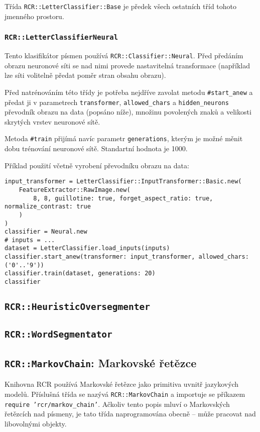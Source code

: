 \documentclass[a4paper]{article}
\begin{document}
Třída \texttt{RCR::LetterClassifier::Base} je předek všech ostatních tříd
tohoto jmenného prostoru.

\subsubsection{\texttt{RCR::LetterClassifierNeural}}
Tento klasifikátor písmen používá \texttt{RCR::Classifier::Neural}.
Před předáním obrazu neuronové síti se nad nimi provede nastavitelná
transformace (například lze síti volitelně předat poměr stran obsahu
obrazu).

Před natrénováním této třídy je potřeba nejdříve zavolat metodu
\texttt{\#start\_anew} a předat ji v parametrech \texttt{transformer},
\texttt{allowed\_chars} a \texttt{hidden\_neurons} převodník obrazu
na data (popsáno níže), množinu povolených znaků a velikosti skrytých
vrstev neuronové sítě.

Metoda \texttt{\#train} přijímá navíc parametr \texttt{generations},
kterým je možné měnit dobu trénování neuronové sítě. Standartní hodnota
je 1000.

Příklad použití včetně vyrobení převodníku obrazu na data:
\begin{lstlisting}
input_transformer = LetterClassifier::InputTransformer::Basic.new(
	FeatureExtractor::RawImage.new(
		8, 8, guillotine: true, forget_aspect_ratio: true, normalize_contrast: true
	)
)
classifier = Neural.new
# inputs = ...
dataset = LetterClassifier.load_inputs(inputs)
classifier.start_anew(transformer: input_transformer, allowed_chars: ('0'..'9'))
classifier.train(dataset, generations: 20)
classifier
\end{lstlisting}

\subsection{\texttt{RCR::HeuristicOversegmenter}}

\subsection{\texttt{RCR::WordSegmentator}}

\subsection{\texttt{RCR::MarkovChain}: Markovské řetězce}
Knihovna RCR používá Markovské řetězce jako primitiva uvnitř jazykových modelů.
Příslušná třída se nazývá \texttt{RCR::MarkovChain} a importuje se příkazem
\texttt{require 'rcr/markov\_chain'}. Ačkoliv tento popis mluví o Markovských
řetězcích nad písmeny, je tato třída naprogramována obecně -- může pracovat nad
libovolnými objekty.
\end{document}
